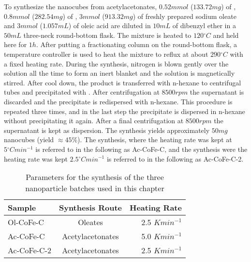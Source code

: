\documentclass[\main/dresen_thesis.tex]{subfiles}
\begin{document}
    To synthesize the nanocubes from acetylacetonates, $0.52 \unit{mmol}$ ($133.72 \unit{mg}$) of  , $0.8 \unit{mmol}$ ($282.54 \unit{mg}$) of , $3 \unit{mmol}$ ($913.32 \unit{mg}$) of freshly prepared sodium oleate and $3 \unit{mmol}$ ($1.057 \unit{mL}$) of oleic acid are diluted in $10 \unit{mL}$ of dibenzyl ether in a $50 \unit{mL}$ three-neck round-bottom flask.
    The mixture is heated to $120 \unit{^\circ C}$ and held here for $1 \unit{h}$.
    After putting a fractionating column on the round-bottom flask, a temperature controller is used to heat the mixture to reflux at about $290 \unit{^\circ C}$ with a fixed heating rate.
    During the synthesis, nitrogen is blown gently over the solution all the time to form an inert blanket and the solution is magnetically stirred.
    After cool down, the product is transferred with n-hexane to centrifugal tubes and precipitated with .
    After centrifugation at $8500 \unit{rpm}$ the supernatant is discarded and the precipitate is redispersed with n-hexane.
    This procedure is repeated three times, and in the last step the precipitate is dispersed in n-hexane without precipitating it again.
    After a final centrifugation at $8500 \unit{rpm}$ the supernatant is kept as dispersion.
    The synthesis yields approximately $50 \unit{mg}$ nanocubes (yield $\approx 45 \%$).
    The synthesis, where the heating rate was kept at $5 \unit{^\circ C min^{-1}}$ is referred to in the following as Ac-CoFe-C, and the synthesis were the heating rate was kept $2.5 \unit{^\circ C min^{-1}}$ is referred to in the following as Ac-CoFe-C-2.


    \begin{table}[ht]
      \centering
      \caption{\label{tab:monolayers:synthesis:nanoparticles}Parameters for the synthesis of the three nanoparticle batches used in this chapter}
      \begin{tabular}{ l | c | r }
        Sample & Synthesis Route &  Heating Rate\\
        \hline
        Ol-CoFe-C & Oleates & 2.5 $\unit{K min^{-1}}$\\
        Ac-CoFe-C & Acetylacetonates & 5.0 $\unit{K min^{-1}}$\\
        Ac-CoFe-C-2 & Acetylacetonates & 2.5 $\unit{K min^{-1}}$\\
        \hline
      \end{tabular}
    \end{table}
\end{document}
